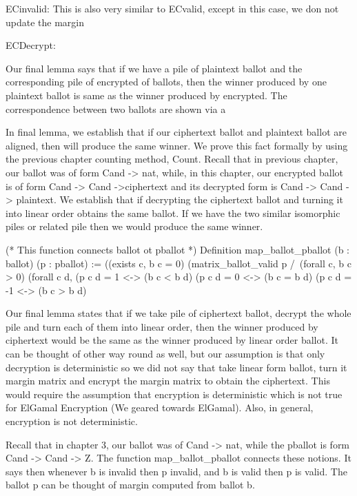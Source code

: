 ECinvalid: 
This is also very similar to ECvalid, except in this case, we don not update the margin

ECDecrypt: 


Our final lemma says that if we have a pile of plaintext ballot and the corresponding pile of encrypted 
of ballots, then the winner produced by one plaintext ballot is same as the winner produced by 
encrypted. The correspondence between two ballots are shown via a 


In final lemma, we establish that if our ciphertext ballot and plaintext ballot are aligned, then will produce the 
same winner. We prove this fact formally by using the previous chapter counting method, Count. Recall that 
in previous chapter, our ballot was of form Cand -> nat, while, in this chapter, our encrypted ballot is 
of form Cand -> Cand ->ciphertext and its decrypted form is Cand -> Cand -> plaintext. We establish 
that if decrypting the ciphertext ballot and turning it into  linear order obtains the same ballot. If we have 
the two similar isomorphic piles or related pile then we would produce the same winner. 


(* This function connects ballot ot pballot *)
    Definition map_ballot_pballot (b : ballot) (p : pballot) :=
      ((exists c,  b c = 0)%
      (matrix_ballot_valid p /\ (forall c, b c > 0)%
       (forall c d, (p c d = 1 <-> (b c < b d)%
               (p c d = 0 <-> (b c = b d)%
               (p c d = -1 <-> (b c > b d)%
               
 Our final lemma states that if we take pile of ciphertext ballot, decrypt the whole pile and turn each of 
 them into linear order, then the winner produced by ciphertext would be the same as the winner produced 
 by linear order ballot. It can be thought of other way round as well, but our assumption is that 
 only decryption is deterministic so we did not say that take linear form ballot, turn it margin 
 matrix and encrypt the margin matrix to obtain the ciphertext. This would require the assumption that 
 encryption is deterministic which is not true for ElGamal Encryption (We geared towards ElGamal). 
 Also, in general, encryption is not deterministic. 
 
 
    
Recall that in chapter 3, our ballot was of Cand -> nat, while the pballot is form Cand -> Cand -> Z. 
The function map_ballot_pballot connects these notions. It says then whenever b is invalid then p invalid, 
and b is valid then p is valid. The ballot p can be thought of margin computed from ballot b. 
    
